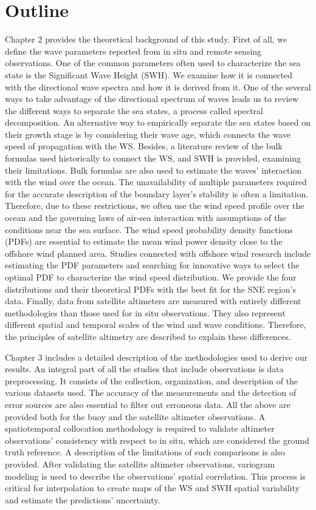 \section{Outline}


Chapter 2 provides the theoretical background of this study. First of all, we define the wave parameters reported from in situ and remote sensing observations. One of the common parameters often used to characterize the sea state is the Significant Wave Height (SWH). We examine how it is connected with the directional wave spectra and how it is derived from it. One of the several ways to take advantage of the directional spectrum of waves leads us to review the different ways to separate the sea states, a process called spectral decomposition. An alternative way to empirically separate the sea states based on their growth stage is by considering their wave age, which connects the wave speed of propagation with the WS. Besides, a literature review of the bulk formulas used historically to connect the WS, and SWH is provided, examining their limitations. Bulk formulas are also used to estimate the waves’ interaction with the wind over the ocean. The unavailability of multiple parameters required for the accurate description of the boundary layer's stability is often a limitation. Therefore, due to these restrictions, we often use the wind speed profile over the ocean and the governing laws of air-sea interaction with assumptions of the conditions near the sea surface. The wind speed probability density functions (PDFs) are essential to estimate the mean wind power density close to the offshore wind planned area. Studies connected with offshore wind research include estimating the PDF parameters and searching for innovative ways to select the optimal PDF to characterize the wind speed distribution. We provide the four distributions and their theoretical PDFs with the best fit for the SNE region's data. Finally, data from satellite altimeters are measured with entirely different methodologies than those used for in situ observations. They also represent different spatial and temporal scales of the wind and wave conditions. Therefore, the principles of satellite altimetry are described to explain these differences.

Chapter 3 includes a detailed description of the methodologies used to derive our results. An integral part of all the studies that include observations is data preprocessing. It consists of the collection, organization, and description of the various datasets used. The accuracy of the measurements and the detection of error sources are also essential to filter out erroneous data. All the above are provided both for the buoy and the satellite altimeter observations. A spatiotemporal collocation methodology is required to validate altimeter observations' consistency with respect to in situ, which are considered the ground truth reference. A description of the limitations of such comparisons is also provided. After validating the satellite altimeter observations, variogram modeling is used to describe the observations' spatial correlation. This process is critical for interpolation to create maps of the WS and SWH spatial variability and estimate the predictions' uncertainty.


